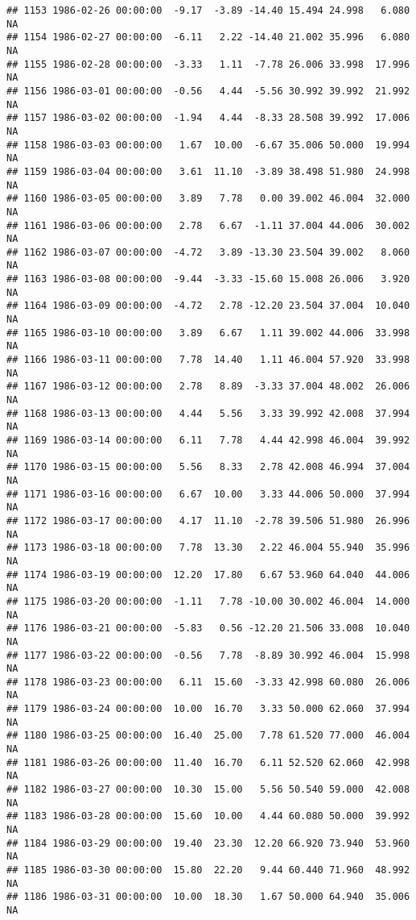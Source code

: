 \documentclass{article}\usepackage{graphicx, color}
\makeatletter
\newenvironment{kframe}{%
 \def\at@end@of@kframe{}%
 \ifinner\ifhmode%
  \def\at@end@of@kframe{\end{minipage}}%
  \begin{minipage}{\columnwidth}%
 \fi\fi%
 \def\FrameCommand##1{\hskip\@totalleftmargin \hskip-\fboxsep
 \colorbox{shadecolor}{##1}\hskip-\fboxsep
     \hskip-\linewidth \hskip-\@totalleftmargin \hskip\columnwidth}%
 \MakeFramed {\advance\hsize-\width
   \@totalleftmargin\z@ \linewidth\hsize
   \@setminipage}}%
 {\par\unskip\endMakeFramed%
 \at@end@of@kframe}
\newenvironment{knitrout}{}{} %
\makeatother
\begin{document}
\begin{knitrout}
\begin{kframe}
\begin{verbatim}
## 1153 1986-02-26 00:00:00  -9.17  -3.89 -14.40 15.494 24.998   6.080     NA
## 1154 1986-02-27 00:00:00  -6.11   2.22 -14.40 21.002 35.996   6.080     NA
## 1155 1986-02-28 00:00:00  -3.33   1.11  -7.78 26.006 33.998  17.996     NA
## 1156 1986-03-01 00:00:00  -0.56   4.44  -5.56 30.992 39.992  21.992     NA
## 1157 1986-03-02 00:00:00  -1.94   4.44  -8.33 28.508 39.992  17.006     NA
## 1158 1986-03-03 00:00:00   1.67  10.00  -6.67 35.006 50.000  19.994     NA
## 1159 1986-03-04 00:00:00   3.61  11.10  -3.89 38.498 51.980  24.998     NA
## 1160 1986-03-05 00:00:00   3.89   7.78   0.00 39.002 46.004  32.000     NA
## 1161 1986-03-06 00:00:00   2.78   6.67  -1.11 37.004 44.006  30.002     NA
## 1162 1986-03-07 00:00:00  -4.72   3.89 -13.30 23.504 39.002   8.060     NA
## 1163 1986-03-08 00:00:00  -9.44  -3.33 -15.60 15.008 26.006   3.920     NA
## 1164 1986-03-09 00:00:00  -4.72   2.78 -12.20 23.504 37.004  10.040     NA
## 1165 1986-03-10 00:00:00   3.89   6.67   1.11 39.002 44.006  33.998     NA
## 1166 1986-03-11 00:00:00   7.78  14.40   1.11 46.004 57.920  33.998     NA
## 1167 1986-03-12 00:00:00   2.78   8.89  -3.33 37.004 48.002  26.006     NA
## 1168 1986-03-13 00:00:00   4.44   5.56   3.33 39.992 42.008  37.994     NA
## 1169 1986-03-14 00:00:00   6.11   7.78   4.44 42.998 46.004  39.992     NA
## 1170 1986-03-15 00:00:00   5.56   8.33   2.78 42.008 46.994  37.004     NA
## 1171 1986-03-16 00:00:00   6.67  10.00   3.33 44.006 50.000  37.994     NA
## 1172 1986-03-17 00:00:00   4.17  11.10  -2.78 39.506 51.980  26.996     NA
## 1173 1986-03-18 00:00:00   7.78  13.30   2.22 46.004 55.940  35.996     NA
## 1174 1986-03-19 00:00:00  12.20  17.80   6.67 53.960 64.040  44.006     NA
## 1175 1986-03-20 00:00:00  -1.11   7.78 -10.00 30.002 46.004  14.000     NA
## 1176 1986-03-21 00:00:00  -5.83   0.56 -12.20 21.506 33.008  10.040     NA
## 1177 1986-03-22 00:00:00  -0.56   7.78  -8.89 30.992 46.004  15.998     NA
## 1178 1986-03-23 00:00:00   6.11  15.60  -3.33 42.998 60.080  26.006     NA
## 1179 1986-03-24 00:00:00  10.00  16.70   3.33 50.000 62.060  37.994     NA
## 1180 1986-03-25 00:00:00  16.40  25.00   7.78 61.520 77.000  46.004     NA
## 1181 1986-03-26 00:00:00  11.40  16.70   6.11 52.520 62.060  42.998     NA
## 1182 1986-03-27 00:00:00  10.30  15.00   5.56 50.540 59.000  42.008     NA
## 1183 1986-03-28 00:00:00  15.60  10.00   4.44 60.080 50.000  39.992     NA
## 1184 1986-03-29 00:00:00  19.40  23.30  12.20 66.920 73.940  53.960     NA
## 1185 1986-03-30 00:00:00  15.80  22.20   9.44 60.440 71.960  48.992     NA
## 1186 1986-03-31 00:00:00  10.00  18.30   1.67 50.000 64.940  35.006     NA

\end{verbatim}
\end{kframe}
\end{knitrout}
\end{document}
